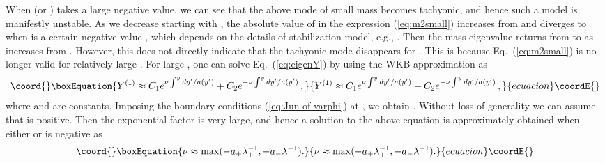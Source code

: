 \documentclass[a4paper,showpacs,preprintnumbers,amsmath,amssymb]{revtex4}
\begin{document}
 
When \myHighlight{$\lambda_+$}\coordHE{} (or \myHighlight{$\lambda_-$}\coordHE{}) takes a large negative value, we can see that the above mode of small mass becomes tachyonic, and hence such a model is manifestly unstable. 
As we decrease \myHighlight{$|\lambda_\pm|$}\coordHE{} starting with \myHighlight{$ \lambda_\pm =-\infty$}\coordHE{}, the absolute value of \coordHE{} in the expression (\ref{eq:m2small}) increases from \coordHE{} and diverges to \myHighlight{$|-\infty|$}\coordHE{} when \myHighlight{$\lambda_\pm$}\coordHE{} is a certain negative value \myHighlight{$\Lambda_\pm$}\coordHE{}, which depends on the details of stabilization model, e.g., \coordHE{}. 
Then the mass eigenvalue returns from \myHighlight{$+\infty$}\coordHE{} to \coordHE{} as 
\myHighlight{$\lambda_\pm$}\coordHE{} increases from \myHighlight{$\Lambda_\pm$}\coordHE{}. 
However, this does not directly indicate that the tachyonic mode disappears for \myHighlight{$\lambda_\pm$}\coordHE{}  \myHighlight{$> \Lambda_\pm$}\coordHE{}.
This is because Eq.~(\ref{eq:m2small}) is no longer valid for relatively large \coordHE{}. 
For large \coordHE{}, one can solve Eq.~(\ref{eq:eigenY}) by using the WKB approximation as 
\begin{equation}\coord{}\boxEquation{
 Y^{(1)}\approx C_1 e^{\nu \int^y dy'/a(y')} +
          C_2 e^{-\nu \int^y dy'/a(y')}\,, 
}{
 Y^{(1)}\approx C_1 e^{\nu \int^y dy'/a(y')} +
          C_2 e^{-\nu \int^y dy'/a(y')}\,, 
}{ecuacion}\coordE{}\end{equation}
where \coordHE{} and \coordHE{} are constants. 
Imposing the boundary conditions (\ref{eq:Jun of varphi}) at \coordHE{}, we obtain 
\coordHE{}. 
Without loss of generality we can assume that \myHighlight{$\nu$}\coordHE{} is positive. 
Then the exponential factor \myHighlight{$\exp[2\nu \int_{y_+}^{y_-}a^{-1} dy ]$}\coordHE{} is very large, and hence a solution to the above equation is approximately obtained when either \myHighlight{$\lambda_+$}\coordHE{} or \myHighlight{$\lambda_-$}\coordHE{} is negative as 
\begin{equation}\coord{}\boxEquation{
\nu \approx \max (- a_+\lambda_+^{-1}, - a_- \lambda_-^{-1}). 
}{
\nu \approx \max (- a_+\lambda_+^{-1}, - a_- \lambda_-^{-1}). 
}{ecuacion}\coordE{}\end{equation}
\end{document}
